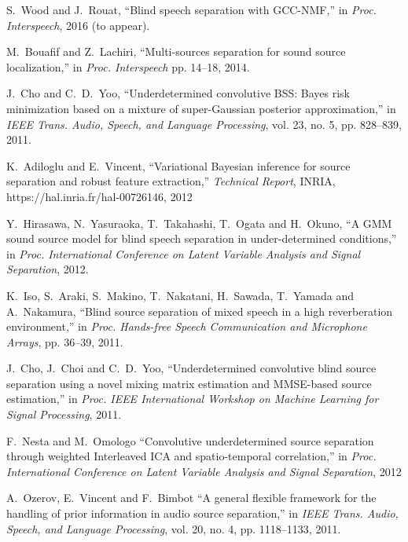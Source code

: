 \documentclass{article}
\begin{document}

\begin{thebibliography}{99}

	S.~Wood and J.~Rouat, 
	``Blind speech separation with GCC-NMF,'' 
	in {\em Proc. Interspeech}, 2016 (to appear). 

	M.~Bouafif and Z.~Lachiri, 
	``Multi-sources separation for sound source localization,''
	in {\em Proc. Interspeech} pp. 14--18, 2014.

	J.~Cho and C.~D.~Yoo, 
	``Underdetermined convolutive BSS: Bayes risk minimization based on a mixture of super-Gaussian posterior approximation,''
	in {\em IEEE Trans. Audio, Speech, and Language Processing}, vol. 23, no. 5, pp. 828--839, 2011.

	K.~Adiloglu and E.~Vincent, 
	``Variational Bayesian inference for source separation and robust feature extraction,''
	{\em Technical Report}, INRIA, https://hal.inria.fr/hal-00726146, 2012

	Y.~Hirasawa, N.~Yasuraoka, T.~Takahashi, T.~Ogata and H.~Okuno,
	``A GMM sound source model for blind speech separation in under-determined conditions,''
	in {\em Proc.  International Conference on Latent Variable Analysis and Signal Separation}, 2012.

	K.~Iso, S.~Araki, S.~Makino, T.~Nakatani, H.~Sawada, T.~Yamada and A.~Nakamura,
	``Blind source separation of mixed speech in a high reverberation environment,'' 
	in {\em Proc. Hands-free Speech Communication and Microphone Arrays}, pp. 36--39, 2011. 

	J.~Cho, J.~Choi and C.~D.~Yoo, 
	``Underdetermined convolutive blind source separation using a novel mixing matrix estimation and MMSE-based source estimation,''
	in {\em Proc. IEEE International Workshop on Machine Learning for Signal Processing}, 2011.

	F.~Nesta and M.~Omologo
	``Convolutive underdetermined source separation through weighted Interleaved ICA and spatio-temporal correlation,''
	in {\em Proc. International Conference on Latent Variable Analysis and Signal Separation}, 2012

	A.~Ozerov, E.~Vincent and F.~Bimbot
	``A general flexible framework for the handling of prior information in audio source separation,''
	in {\em IEEE Trans. Audio, Speech, and Language Processing}, vol. 20, no. 4, pp. 1118--1133, 2011.


\end{thebibliography}
\end{document}
